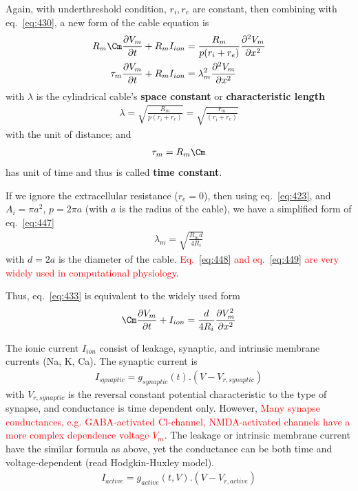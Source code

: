 Again, with underthreshold condition, $r_i, r_e$ are constant, then
combining with eq.~\eqref{eq:430}, a new form of the cable equation is
\begin{equation}
  \label{eq:433}
  \begin{split}
    R_m\Cm\frac{\partial V_m}{\partial t} + R_mI_{ion} &=
    \frac{R_m}{p(r_i+r_e)}  \frac{\partial^2V_m}{\partial x^2}\\
    \tau_m\frac{\partial V_m}{\partial t} + R_mI_{ion} &=
    \lambda_m^2  \frac{\partial^2V_m}{\partial x^2}\\
  \end{split}
\end{equation}
with $\lambda$ is the cylindrical cable's {\bf space constant} or
{\bf characteristic length}
\begin{eqnarray}
  \label{eq:447}
  \lambda = \sqrt{\frac{R_m}{p(r_i+r_e)}} =  \sqrt{\frac{r_m}{(r_i+r_e)}}
\end{eqnarray}
with the unit of distance; and
\begin{eqnarray}
  \label{eq:448}
  \tau_m=R_m\Cm
\end{eqnarray}
has unit of time and thus is called {\bf time constant}.

If we ignore the extracellular resistance ($r_e=0$), then using
eq.~\eqref{eq:423}, and $A_i=\pi a^2$, $p=2\pi a$ (with $a$ is the
radius of the cable), we have a simplified form of eq.~\eqref{eq:447}
\begin{eqnarray}
  \label{eq:449}
  \lambda_m =  \sqrt{\frac{R_m d}{4R_i}}
\end{eqnarray}
with $d=2a$ is the diameter of the
cable.
\textcolor{red}{Eq.~\eqref{eq:448} and eq.~\eqref{eq:449} are very
  widely used in computational physiology}.


Thus, eq.~\eqref{eq:433} is equivalent to the widely used form
\begin{eqnarray}
  \label{eq:558}
  \Cm\frac{\partial V_m}{\partial t} + I_{ion} =
  \frac{d}{4R_i}\frac{\partial V_m^2}{\partial x^2}
\end{eqnarray}


The ionic current $I_{ion}$ consist of leakage, synaptic, and
intrinsic membrane currents (Na, K, Ca). The synaptic current is
\begin{eqnarray}
  \label{eq:559}
  I_{synaptic} = g_{synaptic}(t).(V-V_{r,synaptic})
\end{eqnarray}
with $V_{r,synaptic}$ is the reversal constant potential
characteristic to the type of synapse, and conductance is time
dependent only. However,
\textcolor{red}{Many synapse conductances, e.g. GABA-activated
  Cl-channel, NMDA-activated channels have a more complex dependence
  voltage $V_m$}.
The leakage or intrinsic membrane current have the similar formula as
above, yet the conductance can be both time and voltage-dependent
(read Hodgkin-Huxley model).
\begin{eqnarray}
  \label{eq:560}
  I_{active} = g_{active}(t, V).(V-V_{r,active})
\end{eqnarray}



